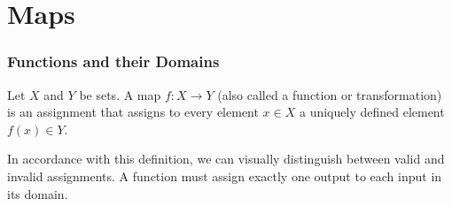 \renewcommand{\thetheorem}{4.\arabic{theorem}}
\setcounter{theorem}{0}
\setcounter{chapter}{3}
%

\chapter{Maps}

\subsection{Functions and their Domains}

\begin{definition}
\label{def:map}
Let $X$ and $Y$ be sets. A map $f: X \to Y$ (also called a function or transformation) is an assignment that assigns to every element $x \in X$ a uniquely defined element $f(x) \in Y$. 
\end{definition}

In accordance with this definition, we can visually distinguish between valid and invalid assignments. A function must assign exactly one output to each input in its domain.


